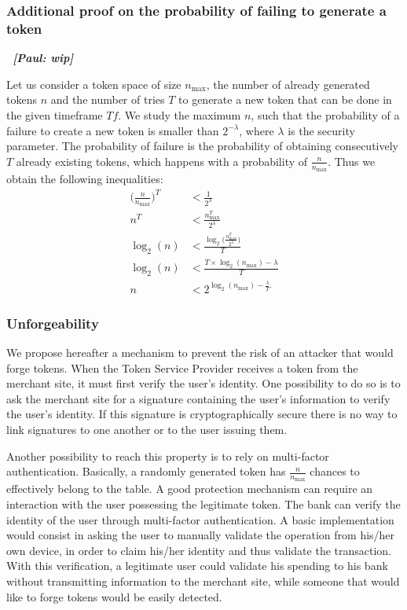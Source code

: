 \documentclass{llncs}
\newcounter{prob}
\newcommand{\ph}[1]{\emph{\bf \color{red}~[Paul: #1]}}
\begin{document}
\subsubsection{Additional proof on the probability of failing to generate a token}\ph{wip}

Let us consider a token space of size $n_{\max}$, the number of already generated tokens $n$ and the number of tries $T$ to generate a new token that can be done in the given timeframe $Tf$. We study the maximum $n$, such that the probability of a failure to create a new token is smaller than $2^{-\lambda}$, where $\lambda$ is the security parameter. The probability of failure is the probability of obtaining consecutively $T$ already existing tokens, which happens with a probability of $\frac{n}{n_{\max}}$. Thus we obtain the following inequalities:
\begin{align*}
\bigg(\frac{n}{n_{\max}}\bigg)^{T} &<\frac{1}{2^\lambda}\\
n^T &<\frac{n_{\max}^T}{2^\lambda}\\
\log_2(n) &<\frac{\log_2\bigg(\frac{n_{\max}^T}{2^\lambda}\bigg)}{T}\\
\log_2(n) &<\frac{T\times\log_2(n_{\max})-\lambda}{T}\\
n &<2^{\log_2(n_{\max})-\frac{\lambda}{T}.}
\end{align*}

\subsubsection{Unforgeability}\label{sect:unforgeability}

We propose hereafter a mechanism to prevent the risk of an attacker that would forge tokens. When the Token Service Provider receives a token from the merchant site, it must first verify the user's identity. One possibility to do so is to ask the merchant site for a signature containing the user's information to verify the user's identity. If this signature is cryptographically secure there is no way to link signatures to one another or to the user issuing them.

Another possibility to reach this property is to rely on multi-factor authentication. Basically, a randomly generated token has $\frac{n}{n_{\max}}$ chances to effectively belong to the table. A good protection mechanism can require an interaction with the user possessing the legitimate token. The bank can verify the identity of the user through multi-factor authentication. A basic implementation would consist in asking the user to manually validate the operation from his/her own device, in order to claim his/her identity and thus validate the transaction.
With this verification, a legitimate user could validate his spending to his bank without transmitting information to the merchant site, while someone that would like to forge tokens would be easily detected.
\end{document}
